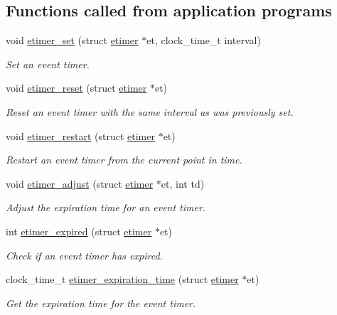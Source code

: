 \subsection*{Functions called from application programs}
\begin{DoxyCompactItemize}
\item 
void \hyperlink{group__etimer_gadb6c83643bbca82b614c50b27c586302}{etimer\-\_\-set} (struct \hyperlink{structetimer}{etimer} $\ast$et, clock\-\_\-time\-\_\-t interval)
\begin{DoxyCompactList}\small\item\em Set an event timer. \end{DoxyCompactList}\item 
void \hyperlink{group__etimer_ga4f73b01caad4528df4ddadc9fbd30eac}{etimer\-\_\-reset} (struct \hyperlink{structetimer}{etimer} $\ast$et)
\begin{DoxyCompactList}\small\item\em Reset an event timer with the same interval as was previously set. \end{DoxyCompactList}\item 
void \hyperlink{group__etimer_ga185a69f1e6e8607fb6e2bc1a0a4900e6}{etimer\-\_\-restart} (struct \hyperlink{structetimer}{etimer} $\ast$et)
\begin{DoxyCompactList}\small\item\em Restart an event timer from the current point in time. \end{DoxyCompactList}\item 
void \hyperlink{group__etimer_gaee6120fc1c980055c90828028eb6b446}{etimer\-\_\-adjust} (struct \hyperlink{structetimer}{etimer} $\ast$et, int td)
\begin{DoxyCompactList}\small\item\em Adjust the expiration time for an event timer. \end{DoxyCompactList}\item 
int \hyperlink{group__etimer_gada74975ee3bc980472df748b373d8636}{etimer\-\_\-expired} (struct \hyperlink{structetimer}{etimer} $\ast$et)
\begin{DoxyCompactList}\small\item\em Check if an event timer has expired. \end{DoxyCompactList}\item 
clock\-\_\-time\-\_\-t \hyperlink{group__etimer_gaccc5133cd775e2adf7a96eab15d2e6ec}{etimer\-\_\-expiration\-\_\-time} (struct \hyperlink{structetimer}{etimer} $\ast$et)
\begin{DoxyCompactList}\small\item\em Get the expiration time for the event timer. \end{DoxyCompactList}\item 

\end{DoxyCompactItemize}

